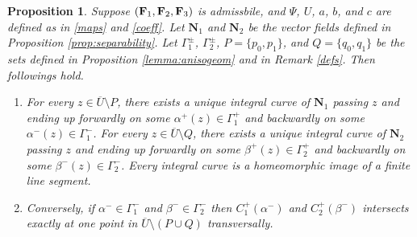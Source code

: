 \documentclass[11pt]{amsart}
\theoremstyle{plain}
\newtheorem{Prop}[Thm]{Proposition}
\theoremstyle{remark}
\numberwithin{equation}{section}
\numberwithin{Thm}{section}
\def\N{{\mathbf N}}
\def\F{{\bf F}}
\begin{document}
\begin{Prop} \label{lemma:2familychar}
Suppose $(\F_1,\F_2,\F_3)$ is admissbile, and $\Psi$, $U$, $a$, $b$, and $c$ are defined as in \eqref{maps} and \eqref{coeff}. Let $\N_1$ and $\N_2$ be the vector fields defined in Proposition \ref{prop:separability}. Let $\Gamma^\pm_1$, $\Gamma^\pm_2$, $P=\{p_0,p_1\}$, and $Q=\{q_0,q_1\}$ be the sets defined in Proposition \ref{lemma:anisogeom} and in Remark \ref{defs}. Then followings hold.
\begin{enumerate}
 \item For every $z \in {\overline{U}\setminus P}$, there exists a unique integral curve of $\N_1$ passing $z$ and ending up forwardly on some $\alpha^+(z)\in\Gamma_1^+$ and backwardly on some $\alpha^-(z)\in\Gamma_1^-$. For every $z\in {\overline{U}\setminus Q}$, there exists a unique integral curve of $\N_2$ passing $z$ and ending up forwardly on some $\beta^+(z)\in\Gamma_2^+$ and backwardly on some $\beta^-(z)\in\Gamma_2^-$. Every integral curve is a homeomorphic image of a finite line segment.
 \item Conversely, if $\alpha^-\in \Gamma^-_1$ and $\beta^-\in \Gamma^-_2$ then $C^+_1(\alpha^-)$ and $C^+_2(\beta^-)$ intersects exactly at one point in $\overline{U}\setminus (P \cup Q)$ transversally.
\end{enumerate}
\end{Prop}
\end{document}
